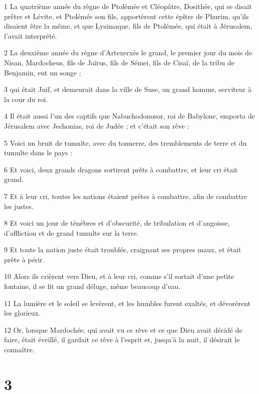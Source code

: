 \par 1 La quatrième année du règne de Ptolémée et Cléopâtre, Dosithée, qui se disait prêtre et Lévite, et Ptolémée son fils, apportèrent cette épître de Phurim, qu'ils disaient être la même, et que Lysimaque, fils de Ptolémée, qui était à Jérusalem, l'avait interprété.
\par 2 La deuxième année du règne d'Artexerxès le grand, le premier jour du mois de Nisan, Mardocheus, fils de Jaïrus, fils de Sémei, fils de Cisaï, de la tribu de Benjamin, eut un songe ;
\par 3 qui était Juif, et demeurait dans la ville de Suse, un grand homme, serviteur à la cour du roi.
\par 4 Il était aussi l'un des captifs que Nabuchodonosor, roi de Babylone, emporta de Jérusalem avec Jechonias, roi de Judée ; et c'était son rêve :
\par 5 Voici un bruit de tumulte, avec du tonnerre, des tremblements de terre et du tumulte dans le pays :
\par 6 Et voici, deux grands dragons sortirent prêts à combattre, et leur cri était grand.
\par 7 Et à leur cri, toutes les nations étaient prêtes à combattre, afin de combattre les justes.
\par 8 Et voici un jour de ténèbres et d'obscurité, de tribulation et d'angoisse, d'affliction et de grand tumulte sur la terre.
\par 9 Et toute la nation juste était troublée, craignant ses propres maux, et était prête à périr.
\par 10 Alors ils crièrent vers Dieu, et à leur cri, comme s'il sortait d'une petite fontaine, il se fit un grand déluge, même beaucoup d'eau.
\par 11 La lumière et le soleil se levèrent, et les humbles furent exaltés, et dévorèrent les glorieux.
\par 12 Or, lorsque Mardochée, qui avait vu ce rêve et ce que Dieu avait décidé de faire, était éveillé, il gardait ce rêve à l'esprit et, jusqu'à la nuit, il désirait le connaître.

\chapter{3}


